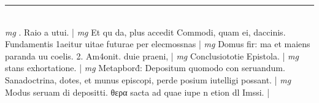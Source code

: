 \documentclass{article}
\begin{document}
\begin{pages}
\vspace{0.5cm}\noindent
\vspace{0.2cm}\rule{1cm}{0.2pt}\\ 
\hspace{0.2cm}\textit{mg}
\footnotesize . Raio a utui. 
\normalsize| 
\hspace{0.2cm}\textit{mg}
\footnotesize Et qu da, plus accedit Commodi, quam ei, daccinis. Fundamentis 1aeitur uitae futurae per elecmossnas 
\normalsize| 
\hspace{0.2cm}\textit{mg}
\footnotesize Domus fir: ma et maiens paranda uu coelis. 2. Am4onit. duie praeni, 
\normalsize| 
\hspace{0.2cm}\textit{mg}
\footnotesize Conclusiototie Epistola. 
\normalsize| 
\hspace{0.2cm}\textit{mg}
\footnotesize  stans exhortatione. 
\normalsize| 
\hspace{0.2cm}\textit{mg}
\footnotesize Metapbord́: Depositum quomodo con seruandum. Sanadoctrina, dotes, et munus episcopi, perde posium iutelligi possant. 
\normalsize| 
\hspace{0.2cm}\textit{mg}
\footnotesize Modus seruam di depositti. θερα sacta ad quae iupe n etion dl Imssi. 
\normalsize| 

\end{pages}
\end{document}
